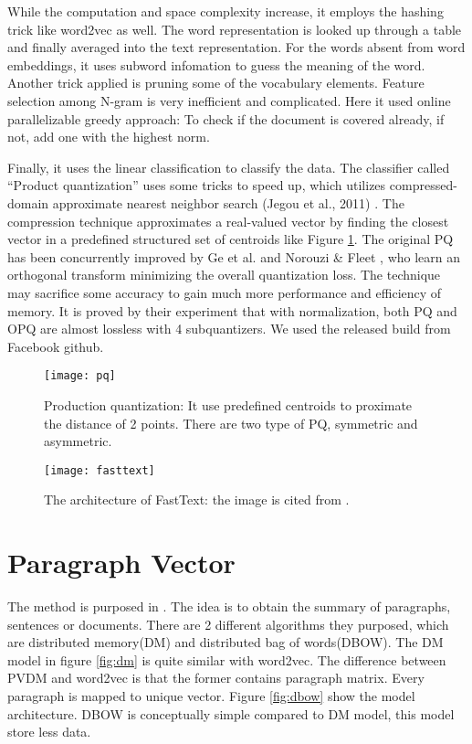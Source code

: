 While the computation and space complexity increase, it employs the hashing trick like word2vec as well. 
The word representation is looked up through a table and finally averaged into the text representation. 
For the words absent from word embeddings, it uses subword infomation\cite{bojanowski2016enriching} to guess the meaning of the word.
Another trick applied is pruning some of the vocabulary elements. Feature selection among N-gram is very inefficient and complicated.
Here it used online parallelizable greedy approach: To check if the document is covered already, if not, add one with the highest norm.

Finally, it uses the linear classification to classify the data. The classifier called \enquote{Product quantization} uses some tricks to speed up, which utilizes compressed-domain approximate nearest neighbor search (Jegou et al., 2011) \cite{jegou2011searching}.
The compression technique approximates a real-valued vector by finding the closest vector in a predefined structured set of centroids like Figure \ref{fig:pq}.
The original PQ has been concurrently improved by Ge et al. \cite{ge2013optimized} and Norouzi \& Fleet , who learn an orthogonal transform minimizing the overall quantization loss.
The technique may sacrifice some accuracy to gain much more performance and efficiency of memory. It is proved by their experiment that with normalization, both PQ and OPQ are almost lossless with 4 subquantizers. 
We used the released build from Facebook github.

\begin{figure}[h]
    \centering
	\texttt{[image: pq]}
    \caption{Production quantization: It use predefined centroids to proximate the distance of 2 points. There are two type of PQ, symmetric and asymmetric. }
    \label{fig:pq}
\end{figure}

\begin{figure}[h]
    \centering
	\texttt{[image: fasttext]}
    \caption{The architecture of FastText: the image is cited from \cite{joulin2016fasttext}.}
    \label{fig:fasttext}
\end{figure}


\section{Paragraph Vector}
	
The method is purposed in \cite{PVDM}. The idea is to obtain the summary of paragraphs, sentences or documents. 
There are 2 different algorithms they purposed, which are distributed memory(DM) and distributed bag of words(DBOW). 
The DM model in figure \ref{fig:dm} is quite similar with word2vec. The difference between PVDM and word2vec is that the former contains paragraph matrix.
Every paragraph is mapped to unique vector. Figure \ref{fig:dbow} show the model architecture. DBOW is conceptually simple compared to DM model, this model store less data. 

